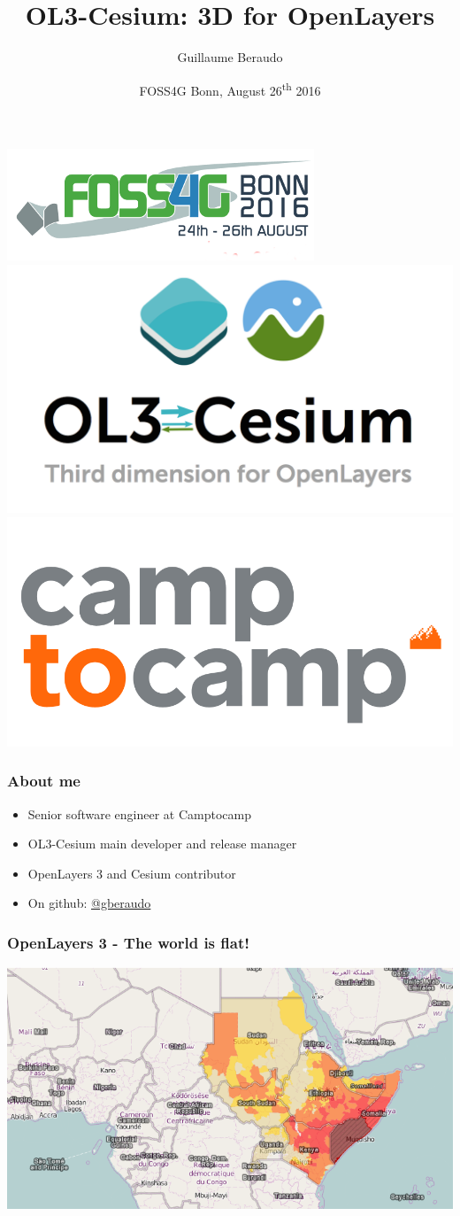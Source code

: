 \documentclass[handout]{beamer}
\title{OL3-Cesium: 3D for OpenLayers}
\author{Guillaume Beraudo}
\date{FOSS4G Bonn, August 26\textsuperscript{th} 2016}
\begin{document}
  \begin{frame}
    \titlepage
    \begin{center}
      \includegraphics[width=.2\linewidth]{images/foss4g-banner.png}
      \includegraphics[width=.2\linewidth]{images/ol3-cesium-wide_arrows.png}
      \includegraphics[width=.2\linewidth]{./images/logo_c2c.png}
    \end{center}
  \end{frame}


  \begin{frame}
    \frametitle{About me}
    \begin{itemize}
      \item Senior software engineer at Camptocamp
      \item OL3-Cesium main developer and release manager
      \item OpenLayers 3 and Cesium contributor
      \item On github: \href {https://github.com/gberaudo}{@gberaudo}
      \end{itemize}
  \end{frame}


  \begin{frame}
    \frametitle{OpenLayers 3 - The world is flat!}
    \begin{center}
     \includegraphics[width=.7\linewidth]{./images/flat_earth2.png}
    \end{center}
  \end{frame}
\end{document}
